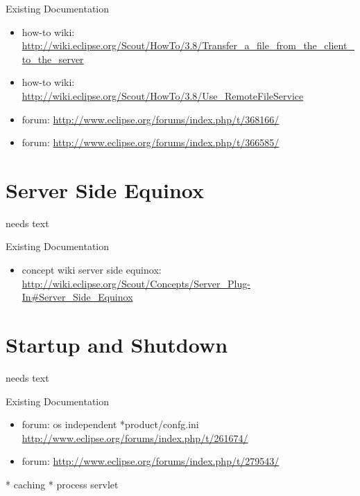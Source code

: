 \documentclass[a4paper,10pt,twoside]{book}
\begin{document}
\noindent Existing Documentation
\begin{itemize}
  \item how-to wiki: \url{http://wiki.eclipse.org/Scout/HowTo/3.8/Transfer_a_file_from_the_client_to_the_server}
  \item how-to wiki: \url{http://wiki.eclipse.org/Scout/HowTo/3.8/Use_RemoteFileService}
  \item forum: \url{http://www.eclipse.org/forums/index.php/t/368166/}
  \item forum: \url{http://www.eclipse.org/forums/index.php/t/366585/}
\end{itemize}

\section{Server Side Equinox}
needs text

\noindent Existing Documentation
\begin{itemize}
  \item concept wiki server side equinox: \url{http://wiki.eclipse.org/Scout/Concepts/Server_Plug-In#Server_Side_Equinox}
\end{itemize}

\section{Startup and Shutdown}
needs text

\noindent Existing Documentation
\begin{itemize}
  \item forum: os independent *product/confg.ini \url{http://www.eclipse.org/forums/index.php/t/261674/}
  \item forum: \url{http://www.eclipse.org/forums/index.php/t/279543/}
\end{itemize}

  * caching
  * process servlet
  
\end{document}
